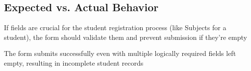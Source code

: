 \subsection*{Expected vs. Actual Behavior}
\begin{tcolorbox}[colback=gray!10, colframe=gray!40, title=Expected Behavior]
If fields are crucial for the student registration process (like Subjects for a student), the form should validate them and prevent submission if they're empty
\end{tcolorbox}

\begin{tcolorbox}[colback=gray!10, colframe=gray!40, title=Actual Behavior]
The form submits successfully even with multiple logically required fields left empty, resulting in incomplete student records
\end{tcolorbox}


